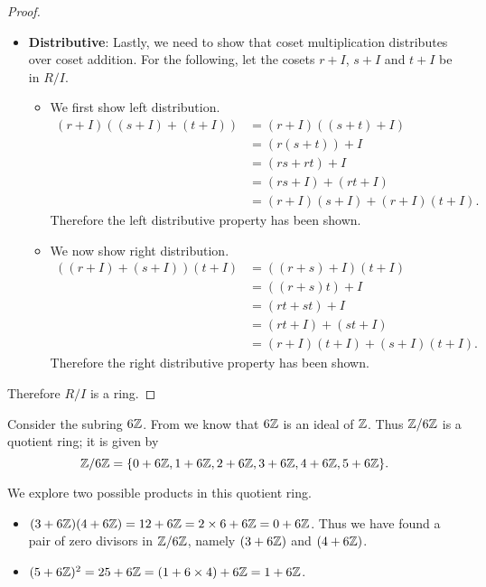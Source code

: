 \begin{proof}
\begin{itemize}
\begin{itemize}
        \end{itemize}
        \item \textbf{Distributive}: Lastly, we need to show that coset multiplication distributes over coset addition. For the following, let the cosets $r+I$, $s+I$ and $t+I$ be in $R/I$.
        \begin{itemize}
            \item We first show left distribution.
            \begin{align*}
                (r+I)((s+I)+(t+I)) &= (r+I)((s+t)+I)\\
                &= (r(s+t))+I\\
                &= (rs+rt)+I\\
                &= (rs+I) + (rt+I)\\
                &=(r+I)(s+I) + (r+I)(t+I).
            \end{align*}
            Therefore the left distributive property has been shown.

            \item We now show right distribution.
            \begin{align*}
                ((r+I)+(s+I))(t+I) &= ((r+s)+I)(t+I)\\
                &= ((r+s)t)+I\\
                &= (rt+st)+I\\
                &= (rt+I) + (st+I)\\
                &= (r+I)(t+I) + (s+I)(t+I).
            \end{align*}
            Therefore the right distributive property has been shown.
        \end{itemize}
    \end{itemize}
    Therefore $R/I$ is a ring.
\end{proof}

\begin{example}
    Consider the subring $6\mathbb{Z}$. From  we know that $6\mathbb{Z}$ is an ideal of $\mathbb{Z}$. Thus $\mathbb{Z}/6\mathbb{Z}$ is a quotient ring; it is given by
    \[
        \mathbb{Z}/6\mathbb{Z} = \{0 + 6\mathbb{Z}, 1+6\mathbb{Z}, 2+6\mathbb{Z}, 3+6\mathbb{Z}, 4+6\mathbb{Z}, 5+6\mathbb{Z}\}.
    \]

    We explore two possible products in this quotient ring.
    \begin{itemize}
        \item $(3+6\mathbb{Z})(4+6\mathbb{Z}) = 12+6\mathbb{Z} = 2\times 6 + 6\mathbb{Z} = 0 + 6\mathbb{Z}$. Thus we have found a pair of zero divisors in $\mathbb{Z}/6\mathbb{Z}$, namely $(3+6\mathbb{Z})$ and $(4+6\mathbb{Z})$.
        \item $(5+6\mathbb{Z})^2 = 25+6\mathbb{Z} = (1 + 6\times4) + 6\mathbb{Z} = 1 + 6\mathbb{Z}$.
    \end{itemize}
\end{example}

